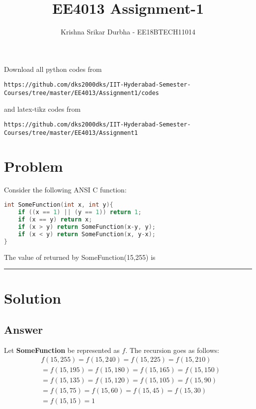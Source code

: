 \documentclass[journal,12pt,twocolumn]{IEEEtran}
\begin{document}
\def\putbox#1#2#3{\makebox[0in][l]{\makebox[#1][l]{}\raisebox{\baselineskip}[0in][0in]{\raisebox{#2}[0in][0in]{#3}}}}
     \def\rightbox#1{\makebox[0in][r]{#1}}
     \def\centbox#1{\makebox[0in]{#1}}
     \def\topbox#1{\raisebox{-\baselineskip}[0in][0in]{#1}}
     \def\midbox#1{\raisebox{-0.5\baselineskip}[0in][0in]{#1}}
\vspace{3cm}
\title{EE4013 Assignment-1}
\author{Krishna Srikar Durbha - EE18BTECH11014}
\maketitle
\newpage
\bigskip
\renewcommand{\thefigure}{\theenumi}
\renewcommand{\thetable}{\theenumi}
Download all python codes from 
\begin{lstlisting}
https://github.com/dks2000dks/IIT-Hyderabad-Semester-Courses/tree/master/EE4013/Assignment1/codes
\end{lstlisting}
%
and latex-tikz codes from 
%
\begin{lstlisting}
https://github.com/dks2000dks/IIT-Hyderabad-Semester-Courses/tree/master/EE4013/Assignment1
\end{lstlisting}
\section{Problem}
Consider the following ANSI C function:
\begin{lstlisting}[language=C]
int SomeFunction(int x, int y){
	if ((x == 1) || (y == 1)) return 1;
	if (x == y) return x;
	if (x > y) return SomeFunction(x-y, y);
	if (x < y) return SomeFunction(x, y-x);
}
\end{lstlisting}
The value of returned by SomeFunction(15,255) is \rule{1cm}{0.15mm}
\section{Solution}
\subsection{Answer}
\quad Let \textbf{SomeFunction} be represented as $f$. The recursion goes as follows:
\[
\begin{split}
&f(15,255) = f(15,240) = f(15,225) = f(15,210)\\
&= f(15,195) = f(15,180) = f(15,165) = f(15,150)\\
&= f(15,135) = f(15,120) = f(15,105) = f(15,90)\\
&= f(15,75) = f(15,60) = f(15,45) = f(15,30)\\
&= f(15,15) = 1
\end{split}\]
\end{document}

